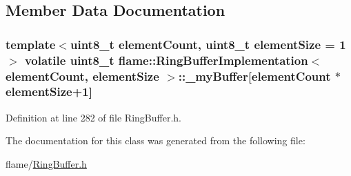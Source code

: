 \subsection{Member Data Documentation}
\hypertarget{classflame_1_1_ring_buffer_implementation_a219b451e18a1e8c7c39e3fc17ae2e64b}{
\subsubsection[{\-\_\-my\-Buffer}]{\setlength{\rightskip}{0pt plus 5cm}template$<$uint8\-\_\-t element\-Count, uint8\-\_\-t element\-Size = 1$>$ volatile uint8\-\_\-t {\bf flame\-::\-Ring\-Buffer\-Implementation}$<$ element\-Count, element\-Size $>$\-::\-\_\-my\-Buffer\mbox{[}element\-Count $\ast$element\-Size+1\mbox{]}\hspace{0.3cm}{\ttfamily [protected]}}}\label{classflame_1_1_ring_buffer_implementation_a219b451e18a1e8c7c39e3fc17ae2e64b}


Definition at line 282 of file Ring\-Buffer.\-h.



The documentation for this class was generated from the following file\-:\begin{DoxyCompactItemize}
\item 
flame/\hyperlink{_ring_buffer_8h}{Ring\-Buffer.\-h}\end{DoxyCompactItemize}
